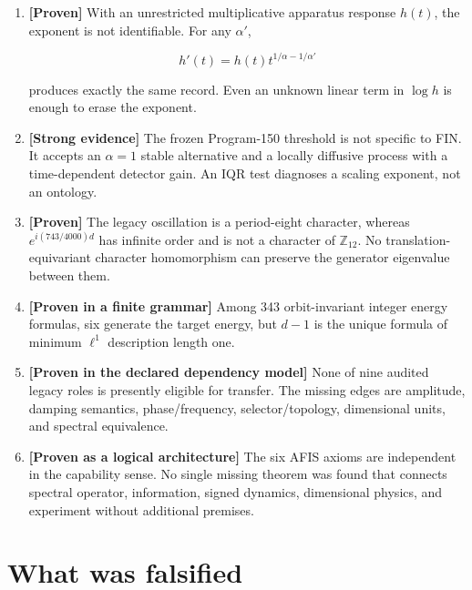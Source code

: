\documentclass[11pt,a4paper,openany]{report}
\newcommand{\statusProven}{\textcolor{fingreen}{[Proven]}}
\newcommand{\statusStrong}{\textcolor{finblue}{[Strong evidence]}}
\begin{document}
\begin{enumerate}
\item 
\textbf{\statusProven{}} With an unrestricted multiplicative apparatus response \(h(t)\), the exponent is not identifiable. For any \(\alpha'\),

\[
h'(t)=h(t)t^{1/\alpha-1/\alpha'}
\]

produces exactly the same record. Even an unknown linear term in \(\log h\) is enough to erase the exponent.

\item 
\textbf{\statusStrong{}} The frozen Program-150 threshold is not specific to FIN. It accepts an \(\alpha=1\) stable alternative and a locally diffusive process with a time-dependent detector gain. An IQR test diagnoses a scaling exponent, not an ontology.

\item 
\textbf{\statusProven{}} The legacy oscillation is a period-eight character, whereas \(e^{i(743/4000)d}\) has infinite order and is not a character of \(\mathbb Z_{12}\). No translation-equivariant character homomorphism can preserve the generator eigenvalue between them.

\item 
\textbf{[Proven in a finite grammar]} Among 343 orbit-invariant integer energy formulas, six generate the target energy, but \(d-1\) is the unique formula of minimum \(\ell^1\) description length one.

\item 
\textbf{[Proven in the declared dependency model]} None of nine audited legacy roles is presently eligible for transfer. The missing edges are amplitude, damping semantics, phase/\allowbreak{}frequency, selector/\allowbreak{}topology, dimensional units, and spectral equivalence.

\item 
\textbf{[Proven as a logical architecture]} The six AFIS axioms are independent in the capability sense. No single missing theorem was found that connects spectral operator, information, signed dynamics, dimensional physics, and experiment without additional premises.

\end{enumerate}

\section{What was falsified}
\end{document}
